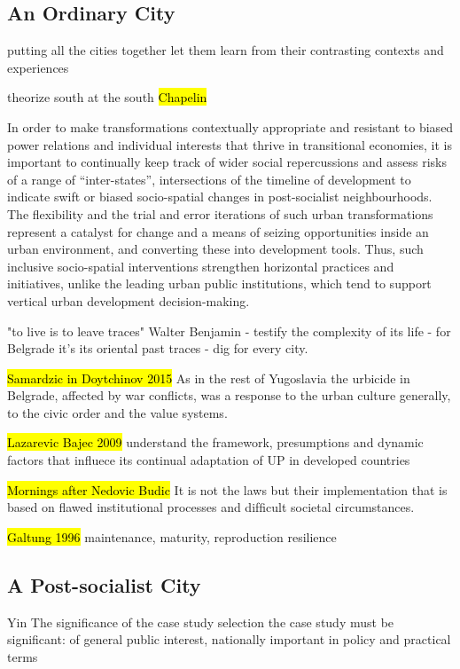 \documentclass[11pt]{report}
\begin{document}
\subsection{An Ordinary City}

putting all the cities together let them learn from their contrasting contexts and experiences

theorize south at the south  \hl{Chapelin}

In order to make transformations contextually appropriate and resistant to biased power relations and individual interests that thrive in transitional economies, it is important to continually keep track of wider social repercussions and assess risks of a range of “inter-states”, intersections of the timeline of development to indicate swift or biased socio-spatial changes in post-socialist neighbourhoods. The flexibility and the trial and error iterations of such urban transformations represent a catalyst for change and a means of seizing opportunities inside an urban environment, and converting these into development tools. Thus, such inclusive socio-spatial interventions strengthen horizontal practices and initiatives, unlike the leading urban public institutions, which tend to support vertical urban development decision-making. 

"to live is to leave traces" Walter Benjamin - testify the complexity of its life - for Belgrade it's its oriental past traces - dig for every city.

\hl{Samardzic in Doytchinov 2015} 
As in the rest of Yugoslavia the urbicide in  Belgrade,  affected  by  war  conflicts,  was  a  response  to  the  urban  culture generally, to the civic order and the value systems.

\hl{Lazarevic Bajec 2009}
understand the framework, presumptions and dynamic factors that influece its continual adaptation of UP in developed countries

\hl{Mornings after Nedovic Budic}
It is not the laws but their implementation that is based on ﬂawed institutional processes and difﬁcult societal circumstances.

\hl{Galtung 1996}
maintenance, maturity, reproduction resilience

\subsection{A Post-socialist City}

Yin
The significance of the case study selection
the case study must be significant: of general public interest, nationally important in policy and practical terms
\end{document}

